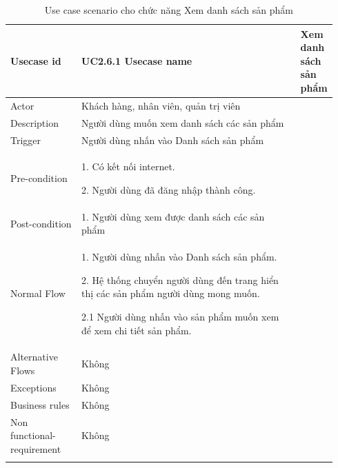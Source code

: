 
\begin{longtable}{|>{\hspace{0pt}}m{0.229\linewidth}|>{\hspace{0pt}}m{0.713\linewidth}|} 
\hline
Usecase id & UC2.6.1 \endfirsthead 
\hline
Usecase name & Xem danh sách sản phẩm \\ 
\hline
Actor & Khách hàng, nhân viên, quản trị viên \\ 
\hline
Description & Người dùng muốn xem danh sách các sản phẩm \\ 
\hline
Trigger & Người dùng nhấn vào Danh sách sản phẩm \\ 
\hline
Pre-condition & 1. Có kết nối internet.\par{}2. Người dùng đã đăng nhập thành công. \\ 
\hline
Post-condition & 1. Người dùng xem được danh sách các sản phẩm \\
\hline
Normal Flow & 1. Người dùng nhấn vào Danh sách sản phẩm.\par{}2. Hệ thống chuyển người dùng đến trang hiển thị các sản phẩm người dùng mong muốn.\par{}2.1 Người dùng nhấn vào sản phẩm muốn xem để xem chi tiết sản phẩm.\\
\hline
Alternative Flows & Không~ \\ 
\hline
Exceptions & Không \\ 
\hline
Business rules & Không \\ 
\hline
Non functional-requirement & Không \\ 
\hline
\caption{Use case scenario cho chức năng Xem danh sách sản phẩm}

\end{longtable}


